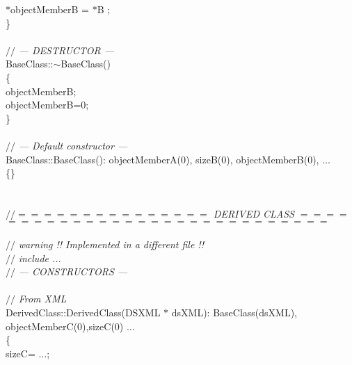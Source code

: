 \begin{flushleft}
{}\hspace*{2\indentation}$\ast$objectMemberB = $\ast$B ;\mbox{}\\
\}\mbox{}\\
\mbox{}\\
{$//$\it{} --- DESTRUCTOR --- {}\mbox{}\\
}BaseClass::$\sim$BaseClass()\mbox{}\\
\{\mbox{}\\
\hspace*{2\indentation}{\bf delete} objectMemberB;\mbox{}\\
\hspace*{2\indentation}objectMemberB=0; \mbox{}\\
\}\mbox{}\\
\mbox{}\\
{$//$\it{} --- Default constructor ---{}\mbox{}\\
}BaseClass::BaseClass(): objectMemberA(0), sizeB(0), objectMemberB(0), $\ldots$ \mbox{}\\
\{\}\mbox{}\\
\mbox{}\\
\mbox{}\\
{$//$\it{}$=$$=$$=$$=$$=$$=$$=$$=$$=$$=$$=$$=$$=$$=$$=$ DERIVED CLASS $=$$=$$=$$=$$=$$=$$=$$=$$=$$=$$=$$=$$=$$=$$=$$=$$=$$=$$=$$=$$=$$=$$=$$=$$=$$=$$=$$=$$=${}\mbox{}\\
}\mbox{}\\
{$//$\it{} warning !! Implemented in a different file !!{}\mbox{}\\
}{$//$\it{} include ...{}\mbox{}\\
}{$//$\it{} --- CONSTRUCTORS ---{}\mbox{}\\
}\mbox{}\\
{$//$\it{} From XML {}\mbox{}\\
}DerivedClass::DerivedClass(DSXML $\ast$ dsXML): BaseClass(dsXML), objectMemberC(0),sizeC(0) $\ldots$\mbox{}\\
\{\mbox{}\\
\hspace*{2\indentation}sizeC= $\ldots$;\mbox{}\\

\end{flushleft}
